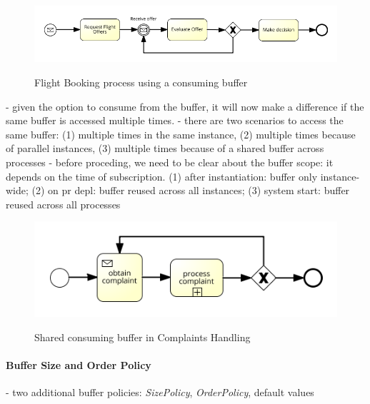 

\begin{figure}[]
	\myfloatalign
	{\includegraphics[width=1\linewidth]{chapters/concept/bpmnx/FlightBooking.png}}
	\caption{Flight Booking process using a consuming buffer}\label{fig:example-flightbooking}
\end{figure}


- given the option to consume from the buffer, it will now make a difference if the same buffer is accessed multiple times.
- there are two scenarios to access the same buffer: (1) multiple times in the same instance, (2) multiple times because of parallel instances, (3) multiple times because of a shared buffer across processes
- before proceding, we need to be clear about the buffer scope: it depends on the time of subscription. (1) after instantiation: buffer only instance-wide; (2) on pr depl: buffer reused across all instances; (3) system start: buffer reused across all processes

\begin{figure}[]
	\myfloatalign
	{\includegraphics[width=1\linewidth]{chapters/concept/bpmnx/ComplaintProcessing.png}}
	\caption{Shared consuming buffer in Complaints Handling}\label{fig:example-complaints}
\end{figure}

\paragraph{Buffer Size and Order Policy\newline}

- two additional buffer policies: \textit{SizePolicy}, \textit{OrderPolicy}, default values


